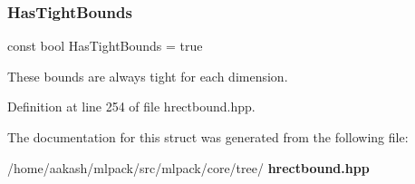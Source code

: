\subsubsection{Has\+Tight\+Bounds}
{\footnotesize\ttfamily const bool Has\+Tight\+Bounds = true\hspace{0.3cm}{\ttfamily [static]}}



These bounds are always tight for each dimension. 



Definition at line 254 of file hrectbound.\+hpp.



The documentation for this struct was generated from the following file\+:\begin{DoxyCompactItemize}
\item 
/home/aakash/mlpack/src/mlpack/core/tree/\textbf{ hrectbound.\+hpp}\end{DoxyCompactItemize}
